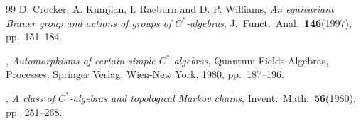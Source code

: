 \documentclass[11pt]{article}
\theoremstyle{plain}
\theoremstyle{definition}
\numberwithin{equation}{section}
\begin{document}
\begin{thebibliography}{99}
{\sc  D. Crocker, A. Kumjian, I. Raeburn and D. P. Williams},
{\it An equivariant Brauer group and actions of groups of $C^*$-algebras},
J.\ Funct.\ Anal.\ {\bf 146}(1997), pp.\ 151--184.
























,
{\it Automorphisms of certain simple $C^*$-algebras},
 Quantum Fields-Algebras, Processes, Springer Verlag, Wien-New York, 1980,
pp.\ 187--196. 








,
{\it A class of $C^*$-algebras and topological Markov chains},
 Invent.\ Math.\
 {\bf 56}(1980), pp.\ 251--268.




\end{thebibliography}
\end{document}
